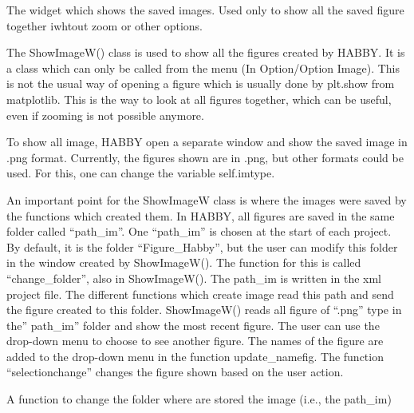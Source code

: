 \documentclass[letterpaper,10pt,english]{sphinxmanual}
\begin{document}
\begin{fulllineitems}
\label{\detokenize{index:src_GUI.Main_windows_1.ShowImageW}}
The widget which shows the saved images. Used only to show all the saved figure together iwhtout zoom or other
options.


The ShowImageW() class is used to show all the figures created by HABBY. It is a class which can only be
called from the menu (In Option/Option Image). This is not the usual way of opening a figure which is usually done
by plt.show from matplotlib. This is the way to look at all figures  together, which can be useful, even if zooming
is not possible anymore.

To show all image, HABBY open a separate window and show the saved image in .png format.  Currently, the figures
shown are in .png, but other formats could be used. For this, one can change the variable self.imtype.

An important point for the ShowImageW  class  is where the images were saved by the functions which created them.
In HABBY, all figures are saved in the same folder called “path\_im”. One “path\_im” is chosen at the start of each
project. By default, it is the folder “Figure\_Habby”, but the user can modify this folder in the window created by
ShowImageW(). The function for this is called “change\_folder”, also in ShowImageW(). The path\_im is written in
the xml project file. The different functions which create image read this path and send the figure created
to this folder. ShowImageW() reads all  figure of “.png” type in the” path\_im” folder and show the most recent
figure. The user can use the drop-down menu to choose to see another figure. The names of the figure are added to
the drop-down menu in the function update\_namefig. The function ``selectionchange'' changes the figure shown based
on the user action.

\begin{fulllineitems}
\label{\detokenize{index:src_GUI.Main_windows_1.ShowImageW.change_folder}}
A function to change the folder where are stored the image (i.e., the path\_im)

\end{fulllineitems}


\end{fulllineitems}
\end{document}
